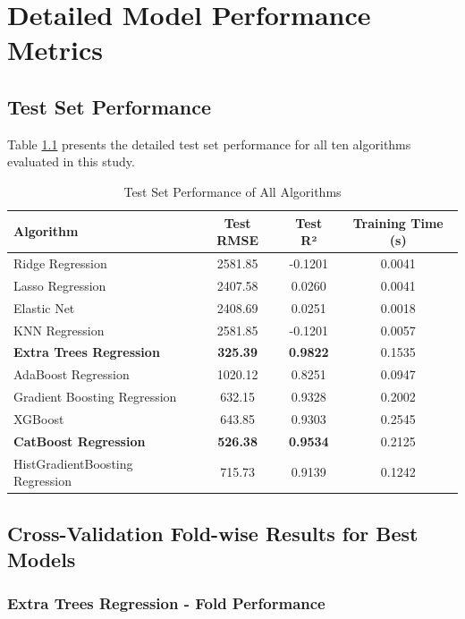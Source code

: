 %
%
\chapter{Detailed Model Performance Metrics}

\section{Test Set Performance}

Table \ref{tab:test_results} presents the detailed test set performance for all ten algorithms evaluated in this study.

\begin{table}[H]
\centering
\caption{Test Set Performance of All Algorithms}
\label{tab:test_results}
\begin{tabular}{|l|c|c|c|}
\hline
\textbf{Algorithm} & \textbf{Test RMSE} & \textbf{Test R²} & \textbf{Training Time (s)} \\
\hline
Ridge Regression & 2581.85 & -0.1201 & 0.0041 \\
Lasso Regression & 2407.58 & 0.0260 & 0.0041 \\
Elastic Net & 2408.69 & 0.0251 & 0.0018 \\
KNN Regression & 2581.85 & -0.1201 & 0.0057 \\
\textbf{Extra Trees Regression} & \textbf{325.39} & \textbf{0.9822} & 0.1535 \\
AdaBoost Regression & 1020.12 & 0.8251 & 0.0947 \\
Gradient Boosting Regression & 632.15 & 0.9328 & 0.2002 \\
XGBoost & 643.85 & 0.9303 & 0.2545 \\
\textbf{CatBoost Regression} & \textbf{526.38} & \textbf{0.9534} & 0.2125 \\
HistGradientBoosting Regression & 715.73 & 0.9139 & 0.1242 \\
\hline
\end{tabular}
\end{table}

\section{Cross-Validation Fold-wise Results for Best Models}

\subsection{Extra Trees Regression - Fold Performance}

